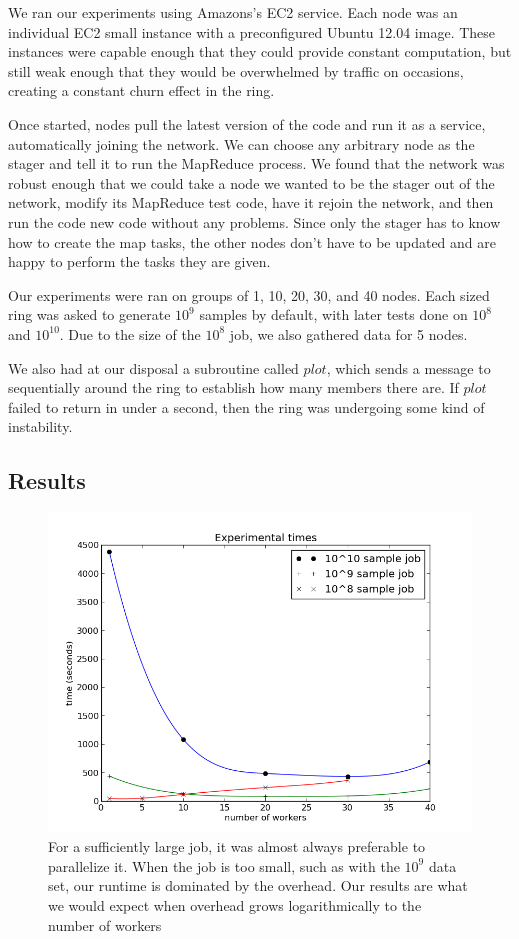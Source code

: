 \documentclass[conference, compsocconf, letterpaper]{IEEEtran}
\begin{document}
We ran our experiments using Amazons's EC2 service.  Each node was an individual EC2 small instance \cite{amazon-instances} with a preconfigured Ubuntu 12.04 image.  These instances were capable enough that they could provide constant computation, but still weak enough that they would be overwhelmed by traffic on occasions, creating a constant churn effect in the ring.  

Once started, nodes pull the latest version of the code and run it as a service, automatically joining the network.  We can choose any arbitrary node as the stager and tell it to run the MapReduce process. We found that the network was robust enough that we could take a node we wanted to be the stager out of the network, modify its MapReduce test code, have it rejoin the network, and then run the code new code without any problems. Since only the stager has to know how to create the map tasks, the other nodes don't have to be updated and are happy to perform the tasks they are given.

Our experiments were ran on groups of 1, 10, 20, 30, and 40 nodes.  Each sized ring was asked to generate $10^{9}$ samples by default, with later tests done on $10^{8}$ and $10^{10}$.  Due to the size of the $10^{8}$ job, we also gathered data for 5 nodes. 

We also had at our disposal a subroutine called $plot$, which sends a message to sequentially around the ring to establish how many members there are.  If $plot$ failed to return in under a second, then the ring was undergoing some kind of instability.

\subsection{Results}

\begin{figure}
    \includegraphics[width=\linewidth]{expTime}
    \caption{For a sufficiently large job, it was almost always preferable to parallelize it.  When the job is too small, such as with the $10^{9}$ data set, our runtime is dominated by the overhead.  Our results are what we would expect when overhead grows logarithmically to the number of workers}
    \label{expTime}
\end{figure}
\end{document}
